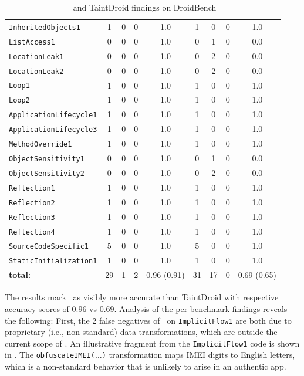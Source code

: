 \begin{table}
\begin{small}
\begin{center}
\begin{tabular}{l|c|c|c|c|c|c|c|c}
	{\tt InheritedObjects1} 				& 1 & 0 & 0 & 1.0 & 1 & 0 & 0 & 1.0 \\
	{\tt ListAccess1} 						& 0 & 0 & 0 & 1.0 & 0 & 1 & 0 & 0.0 \\
	{\tt LocationLeak1} 					& 0 & 0 & 0 & 1.0 & 0 & 2 & 0 & 0.0 \\
	{\tt LocationLeak2} 					& 0 & 0 & 0 & 1.0 & 0 & 2 & 0 & 0.0 \\
	{\tt Loop1} 									& 1 & 0 & 0 & 1.0 & 1 & 0 & 0 & 1.0 \\
	{\tt Loop2} 									& 1 & 0 & 0 & 1.0 & 1 & 0 & 0 & 1.0 \\
	{\tt ApplicationLifecycle1} 			& 1 & 0 & 0 & 1.0 & 1 & 0 & 0 & 1.0 \\
	{\tt ApplicationLifecycle3} 			& 1 & 0 & 0 & 1.0 & 1 & 0 & 0 & 1.0 \\
	{\tt MethodOverride1} 				& 1 & 0 & 0 & 1.0 & 1 & 0 & 0 & 1.0 \\
	{\tt ObjectSensitivity1} 				& 0 & 0 & 0 & 1.0 & 0 & 1 & 0 & 0.0 \\
	{\tt ObjectSensitivity2} 				& 0 & 0 & 0 & 1.0 & 0 & 2 & 0 & 0.0 \\
	{\tt Reflection1} 							& 1 & 0 & 0 & 1.0 & 1 & 0 & 0 & 1.0 \\
	{\tt Reflection2} 							& 1 & 0 & 0 & 1.0 & 1 & 0 & 0 & 1.0 \\
	{\tt Reflection3} 							& 1 & 0 & 0 & 1.0 & 1 & 0 & 0 & 1.0 \\
	{\tt Reflection4} 							& 1 & 0 & 0 & 1.0 & 1 & 0 & 0 & 1.0 \\
	{\tt SourceCodeSpecific1} 		& 5 & 0 & 0 & 1.0 & 5 & 0 & 0 & 1.0 \\
	{\tt StaticInitialization1} 				& 1 & 0 & 0 & 1.0 & 1 & 0 & 0 & 1.0 \\
	\hline \hline
	{\bf total:}	& 29 & 1 & 2 & 0.96 (0.91) & 31 & 17 & 0 & 0.69 (0.65)
	\end{tabular}
	\end{center}
	\caption{\label{Ta:accuracyDBench}\Tool\ and TaintDroid findings on DroidBench}
\end{small}
\end{table}

The results mark \Tool\ as visibly more accurate than TaintDroid with respective accuracy scores of 0.96 vs 0.69. Analysis of the per-benchmark findings reveals the following: First, the 2 false negatives of 
\Tool\ on {\tt ImplicitFlow1} are both due to proprietary (i.e., non-standard) data transformations, which are outside the current scope of \Tool. An illustrative fragment from the {\tt ImplicitFlow1} code is shown in . The {\tt obfuscateIMEI($\ldots$)} transformation maps IMEI digits to English letters, which is a non-standard behavior that is unlikely to arise in an authentic app.

